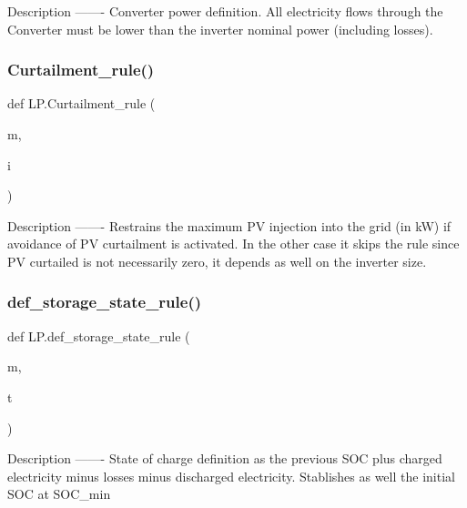 \begin{DoxyVerb}Description
-------
Converter power definition. All electricity flows through the Converter must be lower than the inverter nominal power (including losses).
\end{DoxyVerb}
 \mbox{\label{namespace_l_p_a785fe683f3e79df7f8a0234fd7bae5b7}} 
\subsubsection{\texorpdfstring{Curtailment\+\_\+rule()}{Curtailment\_rule()}}
{\footnotesize\ttfamily def L\+P.\+Curtailment\+\_\+rule (\begin{DoxyParamCaption}\item[{}]{m,  }\item[{}]{i }\end{DoxyParamCaption})}

\begin{DoxyVerb}Description
-------
Restrains the maximum PV injection into the grid (in kW) if avoidance of PV curtailment is activated. In the other case it skips the rule since PV curtailed is not necessarily zero, it depends as well on the inverter size.
\end{DoxyVerb}
 \mbox{\label{namespace_l_p_a063633601bec91a8e0bf87f9bb0aa6ab}} 
\subsubsection{\texorpdfstring{def\+\_\+storage\+\_\+state\+\_\+rule()}{def\_storage\_state\_rule()}}
{\footnotesize\ttfamily def L\+P.\+def\+\_\+storage\+\_\+state\+\_\+rule (\begin{DoxyParamCaption}\item[{}]{m,  }\item[{}]{t }\end{DoxyParamCaption})}

\begin{DoxyVerb}Description
-------
State of charge definition as the previous SOC plus charged electricity minus losses minus discharged electricity. Stablishes as well the initial SOC at SOC_min
\end{DoxyVerb}
 \mbox{\label{namespace_l_p_aac61ce084b61fa22a2546dafc494bcb0}} 

